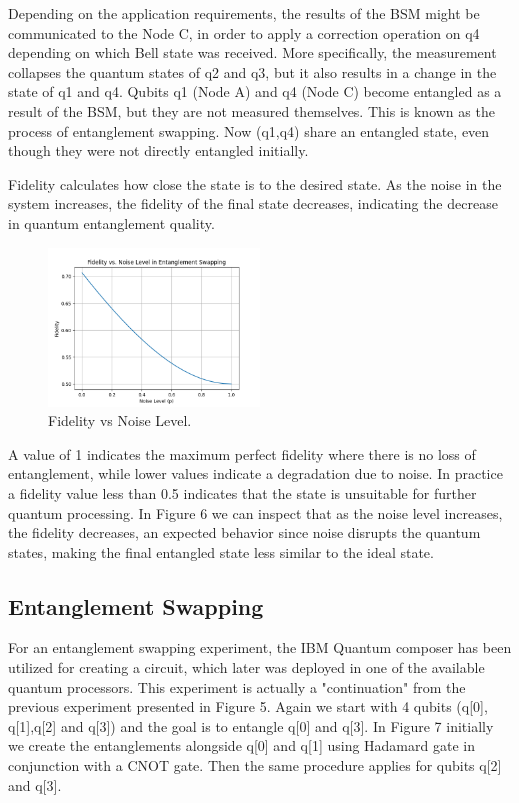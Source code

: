 \documentclass[12pt]{ieeetj}
\begin{document}
		Depending on the application requirements, the results of the BSM might be communicated to the Node C, in order
		to apply a correction operation on q4 depending on which Bell state was received. More specifically, the measurement
		collapses the quantum states of q2 and q3, but it also results in a change in the state of q1 and q4.
		Qubits q1 (Node A) and q4 (Node C) become entangled as a result of the BSM, but they are not measured themselves.
		This is known as the process of entanglement swapping. Now (q1,q4) share an entangled state, even though they 
		were not directly entangled initially.

		Fidelity calculates how close the state is to the desired state. 
		As the noise in the system increases, the fidelity of the final state decreases,
		indicating the decrease in quantum entanglement quality.

		\begin{figure}[H]
			\centering
			\includegraphics[width=0.5\textwidth]{repeater/fid_vs_noise.png}
			\caption{Fidelity vs Noise Level.}
			\label{fig6:}
		\end{figure}		

		A value of 1 indicates the maximum perfect fidelity where there is no loss of entanglement, 
		while lower values indicate a degradation due to noise.
		In practice a fidelity value less than 0.5 indicates that the state is unsuitable for further quantum processing.
		In Figure 6 we can inspect that as the noise level increases, the fidelity decreases,
		an expected behavior since noise disrupts the quantum states,
		making the final entangled state less similar to the ideal state.



		\subsection{Entanglement Swapping}

		For an entanglement swapping experiment, the IBM Quantum composer has been utilized for creating a circuit, which later
		was deployed in one of the available quantum processors. This experiment is actually a "continuation" from the 
		previous experiment presented in Figure 5. Again we start with 4 qubits (q[0], q[1],q[2] and q[3]) and the goal is to entangle
		q[0] and q[3]. In Figure 7 initially we create the entanglements alongside q[0] and q[1] using Hadamard gate in conjunction with
		a CNOT gate. Then the same procedure applies for qubits q[2] and q[3].
\end{document}
